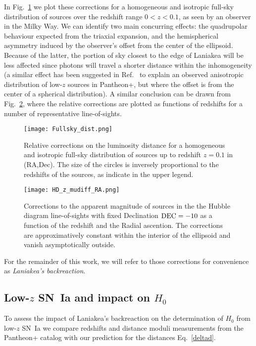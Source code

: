 \documentclass[notitlepage,nofootinbib]{revtex4-1}
\begin{document}
In Fig.~\ref{corrfullsky} we plot these corrections for a homogeneous and isotropic full-sky distribution of sources over the redshift range $0 < z < 0.1$, as seen by an observer in the Milky Way. We can identify two main concurring effects: the quadrupolar behaviour expected from the triaxial expansion, and the hemispherical asymmetry induced by the observer's offset from the center of the ellipsoid. Because of the latter, the portion of sky closest to the edge of Laniakea will be less affected since photons will travel a shorter distance within the inhomogeneity (a similar effect has been suggested in Ref.~\cite{Perivolaropoulos:2023tdt} to explain an observed anisotropic distribution of low-$z$ sources in Pantheon+, but where the offset is from the center of a spherical distribution). A similar conclusion can be drawn from Fig.~\ref{los-corrections}, where the relative corrections are plotted as functions of redshifts for a number of representative line-of-sights.
\begin{figure}[]
    \centering
    \texttt{[image: Fullsky\_dist.png]}\\
	\caption{Relative corrections on the luminosity distance for a homogeneous and isotropic full-sky distribution of sources up to redshift $z=0.1$ in (RA,Dec). The size of the circles is inversely proportional to the redshifts of the sources, as indicate in the upper legend.}
 \label{corrfullsky}
\end{figure}
\begin{figure}[]
    \centering
    \texttt{[image: HD\_z\_mudiff\_RA.png]}\\
	\caption{Corrections to the apparent magnitude of sources in the the Hubble diagram  line-of-sights with fixed Declination $\rm{DEC}=-10$ as a function of the redshift and the Radial ascention. The corrections are approximatively constant within the interior of the ellipsoid and vanish asymptotically outside.}
 \label{los-corrections}
\end{figure}
For the remainder of this work, we will refer to those corrections for convenience as \textit{Laniakea's backreaction}.

\subsection{Low-$z$ SN~Ia and impact on $H_0$}
To assess the impact of Laniakea's backreaction on the determination of $H_0$ from low-$z$ SN~Ia we compare redshifts and distance moduli measurements from the Pantheon+ catalog \cite{Scolnic:2021amr} with our prediction for the distances Eq.~\eqref{deltad}.
\end{document}
